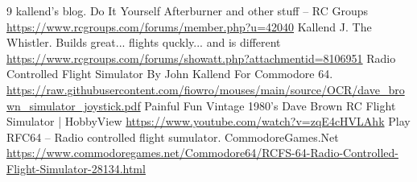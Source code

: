 \documentclass[11pt, a4paper]{article}
\begin{document}
\begin{thebibliography}{9}
 kallend's blog. Do It Yourself Afterburner and other stuff -- RC Groups \url{https://www.rcgroups.com/forums/member.php?u=42040}
 Kallend J. The Whistler. Builds great... flights quckly... and is different \url{https://www.rcgroups.com/forums/showatt.php?attachmentid=8106951}
 Radio Controlled Flight Simulator By John Kallend For Commodore 64. \url{https://raw.githubusercontent.com/fiowro/mouses/main/source/OCR/dave_brown_simulator_joystick.pdf}
 Painful Fun Vintage 1980's Dave Brown RC Flight Simulator | HobbyView \url{https://www.youtube.com/watch?v=zqE4cHVLAhk}
 Play RFC64 -- Radio controlled flight sumulator. CommodoreGames.Net \url{https://www.commodoregames.net/Commodore64/RCFS-64-Radio-Controlled-Flight-Simulator-28134.html}
\end{thebibliography}
\end{document}
